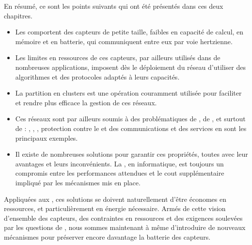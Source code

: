 En résumé, ce sont les points suivants qui ont été présentés dans ces deux chapitres.
\begin{itemize}
    \item Les \rcsfs comportent des capteurs de petite taille, faibles en capacité de calcul, en mémoire et en batterie, qui communiquent entre eux par voie hertzienne.
    \item Les limites en ressources de ces capteurs, par ailleurs utilisés dans de nombreuses applications, imposent dès le déploiement du réseau d'utiliser des algorithmes et des protocoles adaptés à leurs capacités.
    \item La partition en clusters est une opération couramment utilisée pour faciliter et rendre plus efficace la gestion de ces réseaux.
    \item Ces réseaux sont par ailleurs soumis à des problématiques de , de \resilience, et surtout de \secu: , , \integrite, protection contre le  et  des communications et des services en sont les principaux exemples.
    \item Il existe de nombreuses solutions pour garantir ces propriétés, toutes avec leur avantages et leurs inconvénients. La \secu, en informatique, est toujours un compromis entre les performances attendues et le cout supplémentaire impliqué par les mécanismes mis en place.
\end{itemize}
Appliquées aux \rcs, ces solutions se doivent naturellement d'être économes en ressources, et particulièrement en énergie nécessaire.
Armés de cette vision d'ensemble des capteurs, des contraintes en ressources et des exigences soulevées par les questions de \secu, nous sommes maintenant à même d'introduire de nouveaux mécanismes pour préserver encore davantage la batterie des capteurs.
